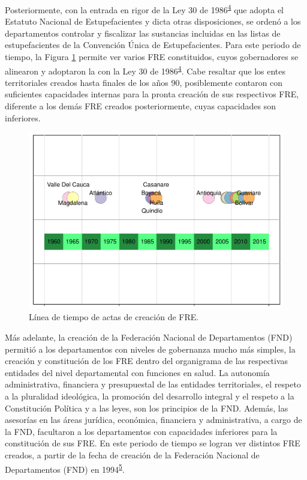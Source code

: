 \documentclass[
  oneside]{book}
\begin{document}
Posteriormente, con la entrada en rigor de la Ley 30 de 1986\textsuperscript{\protect\hyperlink{ref-CongresodelaRepublicadeColombia1986}{4}} que adopta el Estatuto Nacional de Estupefacientes y dicta otras disposiciones, se ordenó a los departamentos controlar y fiscalizar las sustancias incluidas en las listas de estupefacientes de la Convención Única de Estupefacientes. Para este periodo de tiempo, la Figura \ref{fig:serieTiempoCreacion} permite ver varios FRE constituidos, cuyos gobernadores se alinearon y adoptaron la con la Ley 30 de 1986\textsuperscript{\protect\hyperlink{ref-CongresodelaRepublicadeColombia1986}{4}}. Cabe resaltar que los entes territoriales creados hasta finales de los años 90, posiblemente contaron con suficientes capacidades internas para la pronta creación de sus respectivos FRE, diferente a los demás FRE creados posteriormente, cuyas capacidades son inferiores.

\begin{figure}[h]

{\centering \includegraphics[width=1\linewidth]{InformeFinal_files/figure-latex/serieTiempoCreacion-1} 

}

\caption{Línea de tiempo de actas de creación de FRE.}\label{fig:serieTiempoCreacion}
\end{figure}

Más adelante, la creación de la Federación Nacional de Departamentos (FND) permitió a los departamentos con niveles de gobernanza mucho más simples, la creación y constitución de los FRE dentro del organigrama de las respectivas entidades del nivel departamental con funciones en salud. La autonomía administrativa, financiera y presupuestal de las entidades territoriales, el respeto a la pluralidad ideológica, la promoción del desarrollo integral y el respeto a la Constitución Política y a las leyes, son los principios de la FND. Además, las asesorías en las áreas jurídica, económica, financiera y administrativa, a cargo de la FND, facultaron a los departamentos con capacidades inferiores para la constitución de sus FRE. En este periodo de tiempo se logran ver distintos FRE creados, a partir de la fecha de creación de la Federación Nacional de Departamentos (FND) en 1994\textsuperscript{\protect\hyperlink{ref-FederacionNacionaldeDepartamentos2021}{5}}.
\end{document}
